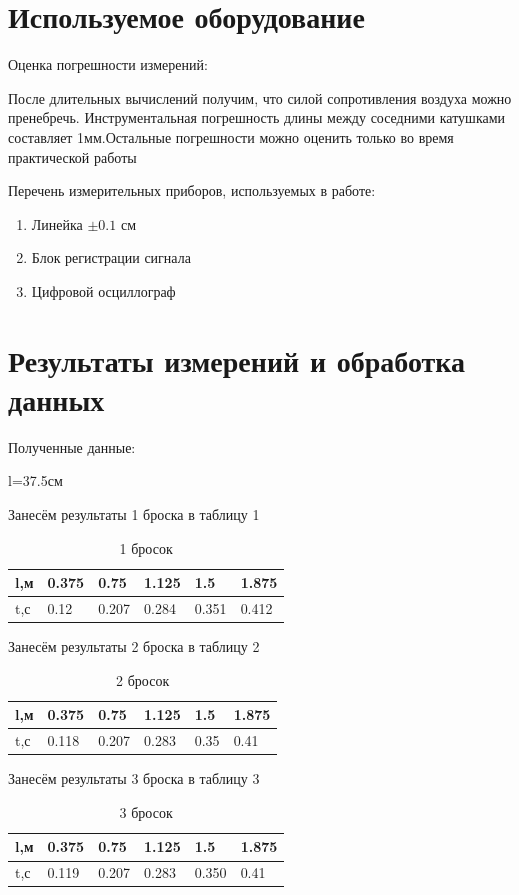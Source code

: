 \documentclass[a4paper, 10pt]{article}%
\begin{document}
\section{Используемое оборудование}
Оценка погрешности измерений:

После длительных вычислений получим, что силой сопротивления воздуха можно пренебречь. Инструментальная погрешность длины между соседними катушками составляет 1мм.Остальные погрешности можно оценить только во время практической работы

Перечень измерительных приборов, используемых в работе:
\begin{enumerate}
    \item Линейка $\pm 0.1$ см
    \item Блок регистрации сигнала
    \item Цифровой осциллограф
\end{enumerate}

\section{Результаты измерений и обработка данных}

Полученные данные:

l=37.5см

Занесём результаты 1 броска в таблицу 1
\begin{table}[!ht]
    \centering
    \begin{tabular}{|l|l|l|l|l|l|}
    \hline
        l,м & 0.375 & 0.75 & 1.125 & 1.5 & 1.875 \\ \hline
        t,с & 0.12 & 0.207 & 0.284 & 0.351 & 0.412 \\ \hline
    \end{tabular}
    \caption{1 бросок}
\end{table}

\newpage
Занесём результаты 2 броска в таблицу 2
\begin{table}[!ht]
    \centering
    \begin{tabular}{|l|l|l|l|l|l|}
    \hline
        l,м & 0.375 & 0.75 & 1.125 & 1.5 & 1.875 \\ \hline
        t,с & 0.118 & 0.207 & 0.283 & 0.35 & 0.41 \\ \hline
    \end{tabular}
    \caption{2 бросок}
\end{table}

Занесём результаты 3 броска в таблицу 3
\begin{table}[!ht]
    \centering
    \begin{tabular}{|l|l|l|l|l|l|}
    \hline
        l,м & 0.375 & 0.75 & 1.125 & 1.5 & 1.875 \\ \hline
        t,с & 0.119 & 0.207 & 0.283 & 0.350 & 0.41 \\ \hline
    \end{tabular}
    \caption{3 бросок}
\end{table}
\end{document}
